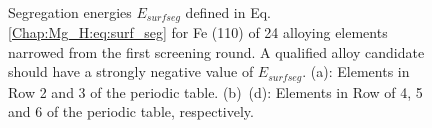 \newpage
\begingroup
\begin{figure}[!ht]
  \centering
  \label{Chap:Mg_H:fig:7a}
  \label{Chap:Mg_H:fig:7b}
  \\
  \label{Chap:Mg_H:fig:7c}
  \label{Chap:Mg_H:fig:7d}
\caption[Surface segregation energies for Fe (110) of 24 alloying elements]{Segregation energies $E_{surf seg}$ defined in Eq. \ref{Chap:Mg_H:eq:surf_seg} for Fe (110) of 24 alloying elements narrowed from the first screening round. A qualified alloy candidate should have a strongly negative value of $E_{surf seg}$. (a): Elements in Row 2 and 3 of the periodic table. (b)~(d): Elements in Row of 4, 5 and 6 of the periodic table, respectively.}
  \label{Chap:Mg_H:fig7}
\end{figure}
\endgroup

